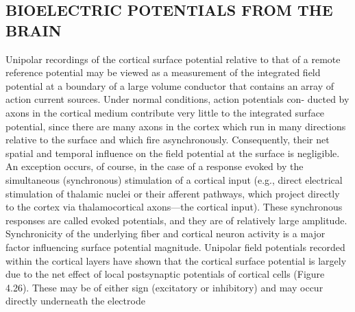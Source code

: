 
\subsection{BIOELECTRIC POTENTIALS FROM THE BRAIN}

Unipolar recordings of the cortical surface potential relative to that of a
remote reference potential may be viewed as a measurement of the integrated
field potential at a boundary of a large volume conductor that contains an array
of action current sources. Under normal conditions, action potentials con-
ducted by axons in the cortical medium contribute very little to the integrated
surface potential, since there are many axons in the cortex which run in many
directions relative to the surface and which fire asynchronously. Consequently,
their net spatial and temporal influence on the field potential at the surface is
negligible. An exception occurs, of course, in the case of a response evoked by
the simultaneous (synchronous) stimulation of a cortical input (e.g., direct
electrical stimulation of thalamic nuclei or their afferent pathways, which
project directly to the cortex via thalamocortical axons—the cortical input).
These synchronous responses are called evoked potentials, and they are of
relatively large amplitude. Synchronicity of the underlying fiber and cortical
neuron activity is a major factor influencing surface potential magnitude.
Unipolar field potentials recorded within the cortical layers have shown
that the cortical surface potential is largely due to the net effect of local
postsynaptic potentials of cortical cells (Figure 4.26). These may be of either
sign (excitatory or inhibitory) and may occur directly underneath the electrode


